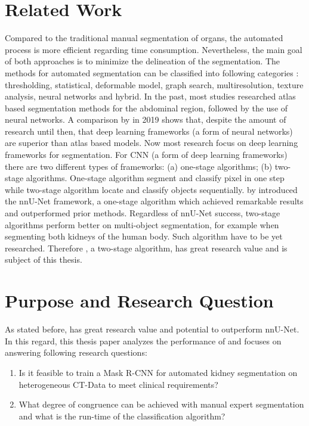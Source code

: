\section{Related Work}

Compared to the traditional manual segmentation of organs, the automated process is more efficient regarding time consumption. Nevertheless, the main goal of both approaches is to minimize the delineation of the segmentation. The methods for automated segmentation can be classified into following categories \cite{Lenchik.2019}: thresholding, statistical,  deformable model, graph search, multiresolution, texture analysis, neural networks and hybrid. In  the past, most studies researched atlas based segmentation methods for the abdominal region, followed by the use of neural networks. A comparison by \citeauthor{Ahn.2019} \cite{Ahn.2019} in 2019 shows that, despite the amount of research until then, that deep learning frameworks (a form of neural networks) are superior than atlas based models. Now most research focus on deep learning frameworks for segmentation. For \ac{CNN} (a form of deep learning frameworks) there are two different types of frameworks: (a) one-stage algorithms; (b)  two-stage algorithms. One-stage algorithm segment and classify pixel in one step while two-stage algorithm locate and classify objects sequentially. \cite{Isensee.2021} by \citeauthor{Isensee.2021} introduced the nnU-Net framework, a one-stage algorithm which achieved remarkable results and outperformed prior methods. Regardless of nnU-Net success, two-stage algorithms perform better on multi-object segmentation, for example when segmenting both kidneys of the human body. Such algorithm have to be yet researched. Therefore   \cite{He.op.2017}, a two-stage algorithm, has great research value \cite{Shu.2020} and is subject of this thesis.




\section{Purpose and Research Question }
As stated before,   \cite{He.op.2017} has great research value and potential to outperform nnU-Net\cite{Isensee.2021}. In this regard, this thesis paper analyzes the performance  of  and focuses on answering following research questions:

\begin{enumerate}
    \item Is it feasible to train a Mask R-CNN for automated kidney segmentation on heterogeneous
    CT-Data to meet clinical requirements?
    \item What degree of congruence can be achieved with manual expert segmentation and what is
    the run-time of the classification algorithm?
\end{enumerate}

